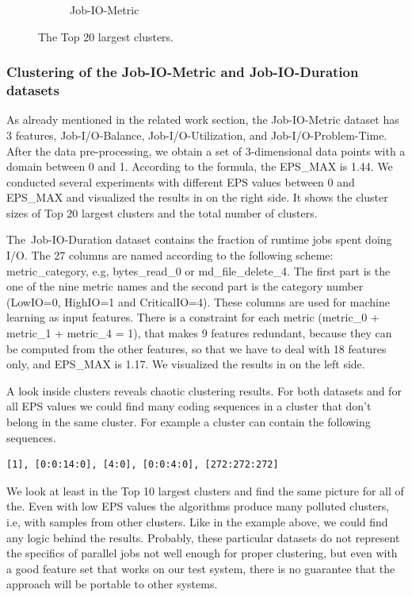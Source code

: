 \documentclass[]{llncs}
\begin{document}
\begin{figure}
\begin{subfigure}[t]{0.45\textwidth}
	\caption{Job-IO-Metric}
	\label{fig:datasets_clustering_results:io_metric}
 \end{subfigure}
 \caption{The Top 20 largest clusters.}
 \label{fig:datasets_clustering_results}
\end{figure}

\subsubsection{Clustering of the Job-IO-Metric and Job-IO-Duration datasets}
As already mentioned in the related work section, the Job-IO-Metric dataset has 3 features, Job-I/O-Balance, Job-I/O-Utilization, and Job-I/O-Problem-Time.
After the data pre-processing, we obtain a set of 3-dimensional data points with a domain between 0 and 1.
According to the formula, the EPS\_MAX is 1.44.
We conducted several experiments with different EPS values between 0 and EPS\_MAX and visualized the results in  on the right side.
It shows the cluster sizes of Top 20 largest clusters and the total number of clusters.

The\ Job-IO-Duration dataset contains the fraction of runtime jobs spent doing I/O.
 The 27 columns are named according to the following scheme: metric\_category, e.g, bytes\_read\_0 or md\_file\_delete\_4.
The first part is the one of the nine metric names and the second part is the category number (LowIO=0, HighIO=1 and CriticalIO=4).
These columns are used for machine learning as input features.
There is a constraint for each metric (metric\_0 + metric\_1 + metric\_4 = 1), that makes 9 features redundant, because they can be computed from the other features, so that we have to deal with 18 features only, and EPS\_MAX is 1.17.
We visualized the results in  on the left side.

A look inside clusters reveals chaotic clustering results.
For both datasets and for all EPS values we could find many coding sequences in a cluster that don't belong in the same cluster.
For example a cluster can contain the following sequences.

\begin{lstlisting}
[1], [0:0:14:0], [4:0], [0:0:4:0], [272:272:272] 
\end{lstlisting}

We look at least in the Top 10 largest clusters and find the same picture for all of the.
Even with low EPS values the algorithms produce many polluted clusters, i.e, with samples from other clusters.
Like in the example above, we could find any logic behind the results.
Probably, these particular datasets do not represent the specifics of parallel jobs not well enough for proper clustering, but even with a good feature set that works on our test system, there is no guarantee that the approach will be portable to other systems.
\end{document}
